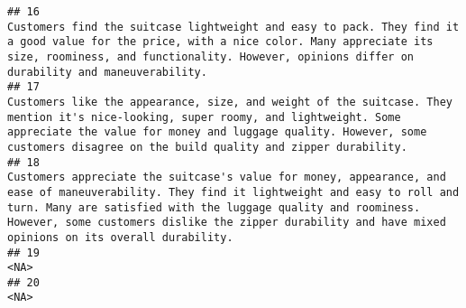 \documentclass[
]{article}
\begin{document}
\begin{verbatim}
## 16                                                                                                                                                                                                                                                                                                                                                                                  Customers find the suitcase lightweight and easy to pack. They find it a good value for the price, with a nice color. Many appreciate its size, roominess, and functionality. However, opinions differ on durability and maneuverability.
## 17                                                                                                                                                                                                                                                                                                                                                       Customers like the appearance, size, and weight of the suitcase. They mention it's nice-looking, super roomy, and lightweight. Some appreciate the value for money and luggage quality. However, some customers disagree on the build quality and zipper durability.
## 18                                                                                                                                                                                                                                                                                                      Customers appreciate the suitcase's value for money, appearance, and ease of maneuverability. They find it lightweight and easy to roll and turn. Many are satisfied with the luggage quality and roominess. However, some customers dislike the zipper durability and have mixed opinions on its overall durability.
## 19                                                                                                                                                                                                                                                                                                                                                                                                                                                                                                                                                                                                                       <NA>
## 20                                                                                                                                                                                                                                                                                                                                                                                                                                                                                                                                                                                                                       <NA>

\end{verbatim}
\end{document}
